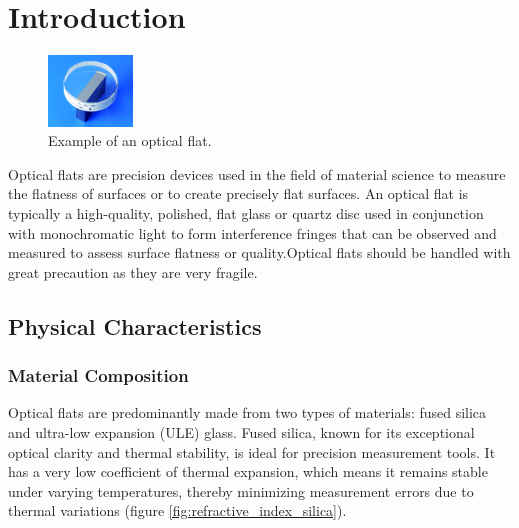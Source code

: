 \documentclass[../main.tex]{subfiles}
\begin{document}
\chapter{Introduction}

\vspace{-5pt}

\begin{minipage}{\textwidth}
\begin{figure}
    \vspace{\dimexpr0.3\baselineskip-\topskip}%
    \noindent
    \includegraphics[width=0.2\textwidth]{Images/Introduction/optical_flat}
    \vspace{-8pt}
    \caption{Example of an optical flat. \cite{optical_flat_mitutoyo}}
    \label{fig:optical_flat_example}
\end{figure}
Optical flats are precision devices used in the field of material science to measure the flatness of surfaces or to create precisely flat surfaces. An optical flat is typically a high-quality, polished, flat glass or quartz disc used in conjunction with monochromatic light to form interference fringes that can be observed and measured to assess surface flatness or quality.Optical flats should be handled with great precaution as they are very fragile. \cite{Toru_2017, edmund_optics_optical_flats, kemet_optical_flats, lapmaster_wolters_optical_flats,Paschottaoptical_flats}
\end{minipage}

\vspace{-10pt}

\section{Physical Characteristics}

\vspace{-15pt}

\subsection{Material Composition}

\vspace{-10pt}

Optical flats are predominantly made from two types of materials: fused silica and ultra-low expansion (ULE) glass. Fused silica, known for its exceptional optical clarity and thermal stability, is ideal for precision measurement tools. It has a very low coefficient of thermal expansion, which means it remains stable under varying temperatures, thereby minimizing measurement errors due to thermal variations (figure \ref{fig:refractive_index_silica}).\cite{Paschottafused_silica}
\end{document}
